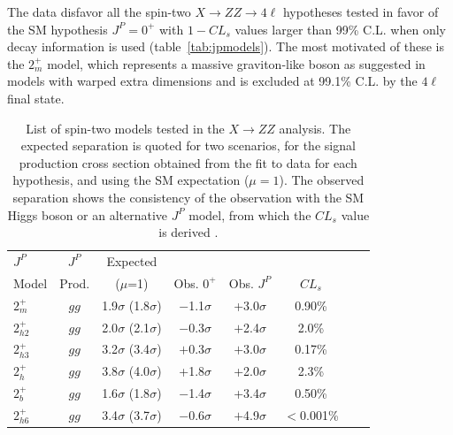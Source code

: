 The data disfavor all the spin-two $X \to ZZ \to 4\ell$ hypotheses tested in favor of the SM hypothesis
$J^P=0^+$ with $1-CL_{s}$ values larger than 99\% C.L. when only decay information is used (table~\ref{tab:jpmodels}). The most motivated of these is the $2_{m}^{+}$ model, which represents a massive graviton-like boson as suggested in models with warped extra dimensions \cite{Randall:1999vf, Randall:1999ee} and is excluded at 99.1\% C.L. by the $4\ell$ final state.

\begin{table}
\caption[List of spin-two models tested in the $X \to ZZ$ analysis.
The expected separation is quoted for two scenarios, for the signal production cross section
obtained from the fit to data for each hypothesis, and using the SM expectation ($\mu=1$).
The observed separation shows the consistency of the observation with the SM Higgs boson
or an alternative $J^{P}$ model, from which the $CL_{s}$ value is derived.]{
List of spin-two models tested in the $X \to ZZ$ analysis.
The expected separation is quoted for two scenarios, for the signal production cross section
obtained from the fit to data for each hypothesis, and using the SM expectation ($\mu=1$).
The observed separation shows the consistency of the observation with the SM Higgs boson
or an alternative $J^{P}$ model, from which the $CL_{s}$ value is derived \cite{Chatrchyan:2013mxa, Khachatryan:2014kca}.
}
\centering
{\renewcommand{\arraystretch}{0.55}
\begin{tabular}{lccccccc}
$J^P$                           & $J^P$        &        Expected  &                       &                    &                \\
Model                           & Prod. &        ($\mu$=1) &  Obs. $0^+$  & Obs. $J^P$ & $CL_{s}$  \\
\hline
$2_{m}^+$     & $gg$       &  1.9$\sigma$ (1.8$\sigma$)  & $-$1.1$\sigma$  & +3.0$\sigma$  &  0.90\% \\
$2^+_{h2}$ & $gg$         & 2.0$\sigma$ (2.1$\sigma$) & $-$0.3$\sigma$ & $+$2.4$\sigma$ & 2.0\%  \\
$2^+_{h3}$ & $gg$         & 3.2$\sigma$ (3.4$\sigma$) & $+$0.3$\sigma$ & $+$3.0$\sigma$ & 0.17\%  \\
$2_{h}^+$      & $gg$       &  3.8$\sigma$ (4.0$\sigma$)  & +1.8$\sigma$    & +2.0$\sigma$  &  2.3\% \\
$2_{b}^+$     & $gg$       &  1.6$\sigma$ (1.8$\sigma$)  & $-$1.4$\sigma$  & +3.4$\sigma$  &  0.50\% \\
$2^+_{h6}$ & $gg$         & 3.4$\sigma$ (3.7$\sigma$) & $-$0.6$\sigma$ & $+$4.9$\sigma$ & $<$0.001\% \\

\end{tabular}}
\end{table}
